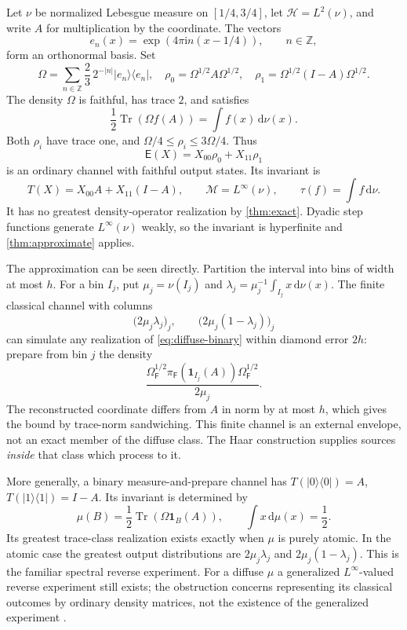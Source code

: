 \documentclass[11pt,reqno]{amsart}
\theoremstyle{definition}
\theoremstyle{remark}
\numberwithin{equation}{section}
\DeclareMathOperator{\Tr}{Tr}
\newcommand{\M}{\mathcal M}
\newcommand{\HH}{\mathcal H}
\newcommand{\E}{\mathsf E}
\newcommand{\F}{\mathsf F}
\newcommand{\one}{\mathbf 1}
\newcommand{\dd}{\mathrm d}
\newcommand{\ii}{\mathrm i}
\begin{document}
Let $\nu$ be normalized Lebesgue measure on $[1/4,3/4]$, let $\HH=L^2(\nu)$, and write $A$ for multiplication by the coordinate. The vectors
\[
 e_n(x)=\exp(4\pi\ii n(x-1/4)),\qquad n\in\mathbb Z,
\]
form an orthonormal basis. Set
\[
 \Omega=\sum_{n\in\mathbb Z}\frac23\,2^{-|n|}|e_n\rangle\langle e_n|,
 \quad\rho_0=\Omega^{1/2}A\Omega^{1/2},\quad
 \rho_1=\Omega^{1/2}(I-A)\Omega^{1/2}.
\]
The density $\Omega$ is faithful, has trace $2$, and satisfies
\[
 \frac12\Tr(\Omega f(A))=\int f(x)\,\dd\nu(x).
\]
Both $\rho_i$ have trace one, and $\Omega/4\le\rho_i\le3\Omega/4$. Thus
\begin{equation}\label{eq:diffuse-binary}
 \E(X)=X_{00}\rho_0+X_{11}\rho_1
\end{equation}
is an ordinary channel with faithful output states. Its invariant is
\[
 T(X)=X_{00}A+X_{11}(I-A),\qquad
 \M=L^\infty(\nu),\qquad\tau(f)=\int f\,\dd\nu.
\]
It has no greatest density-operator realization by \cref{thm:exact}. Dyadic step functions generate $L^\infty(\nu)$ weakly, so the invariant is hyperfinite and \cref{thm:approximate} applies.

The approximation can be seen directly. Partition the interval into bins of width at most $h$. For a bin $I_j$, put $\mu_j=\nu(I_j)$ and $\lambda_j=\mu_j^{-1}\int_{I_j}x\,\dd\nu(x)$. The finite classical channel with columns
\[
 \bigl(2\mu_j\lambda_j\bigr)_j,
 \qquad \bigl(2\mu_j(1-\lambda_j)\bigr)_j
\]
can simulate any realization of \eqref{eq:diffuse-binary} within diamond error $2h$: prepare from bin $j$ the density
\[
 \frac{\Omega_\F^{1/2}\pi_\F(\one_{I_j}(A))\Omega_\F^{1/2}}{2\mu_j}.
\]
The reconstructed coordinate differs from $A$ in norm by at most $h$, which gives the bound by trace-norm sandwiching. This finite channel is an external envelope, not an exact member of the diffuse class. The Haar construction supplies sources \emph{inside} that class which process to it.

More generally, a binary measure-and-prepare channel has $T(|0\rangle\langle0|)=A$, $T(|1\rangle\langle1|)=I-A$. Its invariant is determined by
\[
 \mu(B)=\frac12\Tr(\Omega\one_B(A)),\qquad \int x\,\dd\mu(x)=\frac12.
\]
Its greatest trace-class realization exists exactly when $\mu$ is purely atomic. In the atomic case the greatest output distributions are $2\mu_j\lambda_j$ and $2\mu_j(1-\lambda_j)$. This is the familiar spectral reverse experiment. For a diffuse $\mu$ a generalized $L^\infty$-valued reverse experiment still exists; the obstruction concerns representing its classical outcomes by ordinary density matrices, not the existence of the generalized experiment \cite{Matsumoto,Hiai,Holevo}.
\end{document}
